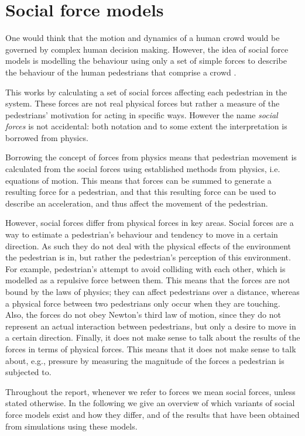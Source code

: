 \section{Social force models}
\label{sec:social-forces}
One would think that the motion and dynamics of a human crowd would be
governed by complex human decision making. However, the idea of social force
models is modelling the behaviour using only a set of simple forces to
describe the behaviour of the human pedestrians that comprise a crowd 
\cite{social-force}.

This works by calculating a set of social forces affecting each pedestrian in 
the system.  These forces are not real physical forces 
but rather a measure of the  pedestrians' 
motivation for acting in specific ways. However the name \emph{social forces}
is not accidental: both notation and to some extent the interpretation is
borrowed from physics.

Borrowing the concept of forces from physics 
means that pedestrian movement is calculated from the social forces using 
established methods from physics, i.e. equations of motion. This means 
that forces can be summed to generate a resulting force for a pedestrian, and 
that this resulting force can be used to describe an acceleration, and thus 
affect the movement of the pedestrian.

However, social forces differ from physical forces in key areas. Social forces 
are a way to estimate a pedestrian's behaviour and tendency to move in a 
certain direction. As such they do not deal with the physical effects of the 
environment the pedestrian is in, but rather the pedestrian's perception of 
this environment. For example, pedestrian's attempt to avoid colliding with 
each other, which is modelled as a repulsive force between them. This means 
that the forces are not bound by the laws of physics; they can affect 
pedestrians over a distance, whereas a physical force between two pedestrians 
only occur when they are touching. Also, the forces do not obey Newton's third 
law of motion, since they do not represent an actual interaction between 
pedestrians, but only a desire to move in a certain direction. Finally, it 
does not make sense to talk about the results of the forces in terms of 
physical forces. This means that it does not make sense to talk about, e.g., 
pressure by measuring the magnitude of the forces a pedestrian is subjected 
to.

Throughout the report, whenever we refer to forces we mean social forces, 
unless stated otherwise. In the following we give an overview of which 
variants of social force models exist and how they differ, and of the results 
that have been obtained from simulations using these models.

